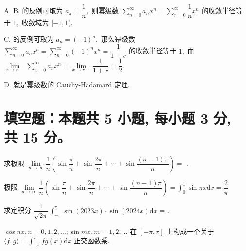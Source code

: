 \begin{solution}
A. B. 的反例可取为 $a_n = \dfrac{1}{n},$ 则幂级数 $\sum\limits_{n=0}^\infty a_n x^n = \sum\limits_{n=0}^\infty \dfrac{1}{n} x^n$ 的收敛半径等于 $1,$ 收敛域为 $[-1, 1).$

C. 的反例可取为 $a_n = (-1)^n,$ 那么幂级数 $\sum\limits_{n=0}^\infty a_n x^n = \sum\limits_{n=0}^\infty (-1)^n x^n = \dfrac{1}{1+x}$ 的收敛半径等于 $1,$ 而 $\lim\limits_{x \to r-} \sum\limits_{n=0}^\infty a_n x^n = \lim\limits_{x \to r-} \dfrac{1}{1+x} = \dfrac{1}{2}.$

D. 就是幂级数的 Cauchy-Hadamard 定理.
\end{solution}


\section{填空题：本题共 5 小题, 每小题 3 分, 共 15 分。}



\begin{question}
求极限 $\lim\limits_{n\to\infty} \dfrac{1}{n} \left( \sin\dfrac{\pi}{n} + \sin\dfrac{2\pi}{n} + \cdots + \sin\dfrac{(n-1)\pi}{n} \right) = $ \fillin[$\dfrac{2}{\pi}$].
\end{question}

\begin{solution}
极限 $\lim\limits_{n\to\infty} \dfrac{1}{n} \left( \sin\dfrac{\pi}{n} + \sin\dfrac{2\pi}{n} + \cdots + \sin\dfrac{(n-1)\pi}{n} \right) = \int_0^1 \sin \pi x \mathrm{d} x = \dfrac{2}{\pi}$
\end{solution}

\begin{question}
求定积分 $\dfrac{1}{\sqrt{2\pi}}\int_{-\pi}^{\pi} \sin (2023 x) \cdot \sin (2024 x) \mathrm{d} x$ = \fillin[0].
\end{question}

\begin{solution}
$\cos nx, n = 0, 1, 2, \dots; \sin m x, m = 1, 2, \dots$ 在 $[-\pi, \pi]$ 上构成一个关于 $\langle f, g \rangle = \int_{-\pi}^{\pi} fg (x) \mathrm{d} x$ 正交函数系.
\end{solution}


